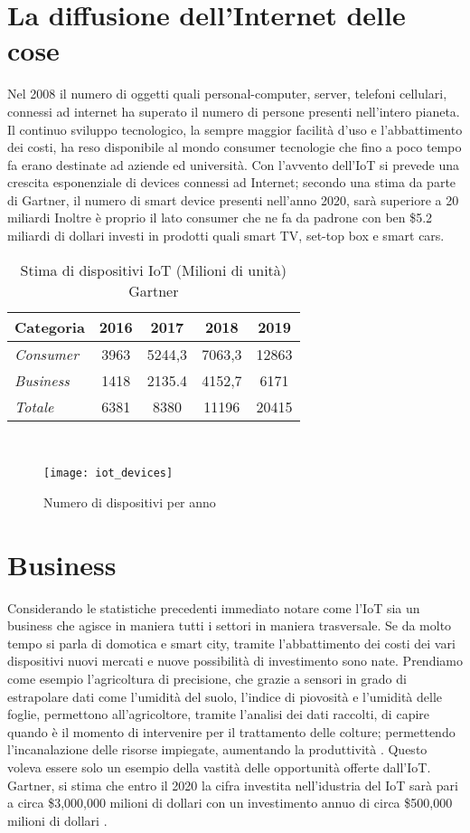 \section{La diffusione dell'Internet delle cose}
Nel 2008 il numero di oggetti quali personal-computer, server, telefoni cellulari,
connessi ad internet ha superato il numero di persone presenti nell'intero
pianeta. Il continuo sviluppo tecnologico, la sempre maggior facilità d'uso e
l'abbattimento dei costi, ha reso disponibile al mondo consumer tecnologie che
fino a poco tempo fa erano destinate ad aziende ed università. 
Con l'avvento dell'IoT si prevede una crescita esponenziale di devices connessi
ad Internet;  secondo  una stima da parte di Gartner, il numero di smart
device presenti nell'anno 2020, sarà superiore a 20 miliardi \cite{gartner2016}
Inoltre è proprio il lato consumer che ne fa da padrone con ben \$5.2 miliardi
di dollari investi in prodotti quali smart TV, set-top box e smart cars.
\\
\begin{table}[h]
        \centering
        \begin{tabular}{l|c|c|c|c}
                \textbf{Categoria}  & 2016 & 2017 & 2018 & 2019 \\
                \hline
                \emph{Consumer}  & 3963 & 5244,3 & 7063,3 & 12863 \\
                \emph{Business}  & 1418 & 2135.4 & 4152,7 & 6171  \\
                \emph{Totale }   & 6381 & 8380   & 11196  & 20415 \\
        \end{tabular}
        \caption{Stima di dispositivi IoT (Milioni di unità)
        Gartner\cite{gartner2016}}
\end{table}
\\
\begin{figure}[h]
        \centering 
                \texttt{[image: iot\_devices]}
        \caption{Numero di dispositivi per anno}
\end{figure}
\section{Business}
Considerando le statistiche precedenti immediato notare come l'IoT sia un
business che agisce in maniera tutti i settori in maniera trasversale.
Se da molto tempo si parla di domotica e smart city, tramite l'abbattimento dei
costi dei vari dispositivi nuovi mercati e nuove possibilità di investimento
sono nate. Prendiamo come esempio l'agricoltura di precisione, che grazie a
sensori in grado di estrapolare dati come l'umidità del suolo, l'indice di
piovosità e l'umidità delle foglie, 
permettono all'agricoltore, tramite l'analisi dei dati raccolti, di capire
quando è il momento di intervenire per il trattamento delle colture; permettendo
l'incanalazione delle risorse impiegate, aumentando la produttività . 
Questo voleva essere solo un esempio della vastità delle opportunità  offerte
dall'IoT. Gartner, si stima che entro il 2020 la cifra
investita nell'idustria del IoT sarà pari a circa \$3,000,000 milioni di dollari
con un investimento annuo di circa \$500,000 milioni di dollari
\cite{gartner2016}. 

